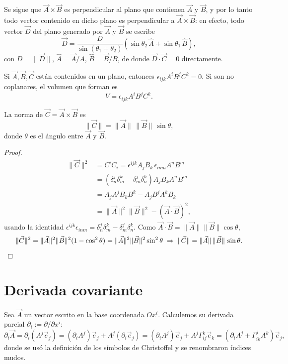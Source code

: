 Se sigue que $\vec A\times\vec B$ es perpendicular al plano que
contienen $\vec A$ y $\vec B$, y por lo tanto todo vector contenido en
dicho plano es perpendicular a $\vec A\times\vec B$: en efecto, todo
vector $\vec D$ del plano generado por $\vec A$ y $\vec B$ se escribe
\[
\vec D = \frac{D}{\sin(\theta_1+\theta_2)}\left(\sin\theta_2\, \hat A +
\sin\theta_1\, \hat B\right),
\]
con $D=\|\vec D\|$, $\hat A=\vec A/A$, $\hat B=\vec B/B$, de donde
$\vec D\cdot\vec C = 0$ directamente.

\begin{proposicionc}
Si $\vec A,\vec B,\vec C$ están contenidos en un plano, entonces
$\epsilon_{ijk}A^iB^jC^k=0$. Si son no coplanares, el volumen que forman
es
\[
V = \epsilon_{ijk}A^iB^jC^k .
\]
\end{proposicionc}

\begin{proposicionc}
La norma de $\vec C=\vec A\times\vec B$ es
\[
\|\vec C\| = \|\vec A\|\,\|\vec B\|\,\sin\theta ,
\]
donde $\theta$ es el ángulo entre $\vec A$ y $\vec B$.
\end{proposicionc}

\begin{proof}
\begin{align*}
\|\vec C\|^2 &= C^iC_i = \epsilon^{ijk}A_jB_k\,\epsilon_{inm}A^nB^m \\
&= \left(\delta^j_n\delta^k_m - \delta^j_m\delta^k_n\right) A_jB_kA^nB^m
\\
&= A_jA^jB_kB^k - A_jB^jA^kB_k \\
&= \|\vec A\|^2\|\vec B\|^2 - (\vec A\cdot\vec B)^2,
\end{align*}
usando la identidad $\epsilon^{ijk}\epsilon_{inm} =
\delta^j_n\delta^k_m-\delta^j_m\delta^k_n$. Como $\vec A\cdot\vec B =
\|\vec A\|\|\vec B\|\cos\theta$,
\[
\|\vec C\|^2 = \|\vec A\|^2\|\vec B\|^2(1-\cos^2\theta) = \|\vec
A\|^2\|\vec B\|^2\sin^2\theta \;\Rightarrow\; \|\vec C\| = \|\vec
A\|\,\|\vec B\|\,\sin\theta . \qedhere
\]
\end{proof}

\section{Derivada covariante}

Sea $\vec A$ un vector escrito en la base coordenada $Ox^i$. Calculemos
su derivada parcial $\partial_i := \partial/\partial x^i$:
\[
\partial_i \vec A = \partial_i(A^j\vec e_j) = (\partial_iA^j)\vec e_j +
A^j(\partial_i\vec e_j) = (\partial_iA^j)\vec e_j + A^j\Gamma^k_{ij}\vec
e_k = \left(\partial_iA^j + \Gamma^j_{ik}A^k\right)\vec e_j ,
\]
donde se usó la definición de los símbolos de Christoffel y se
renombraron índices mudos.

